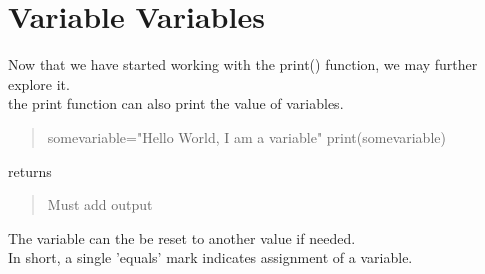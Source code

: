 \section{Variable Variables}
Now that we have started working with the print() function, we may further explore it.\\
the print function can also print the value of variables.
\begin{quote}
somevariable="Hello World, I am a variable"\newline
print(somevariable)
\end{quote}
returns
\begin{quote}
Must add output
\end{quote}
The variable can the be reset to another value if needed.\\ In short, a single 'equals' mark indicates assignment of a variable.
